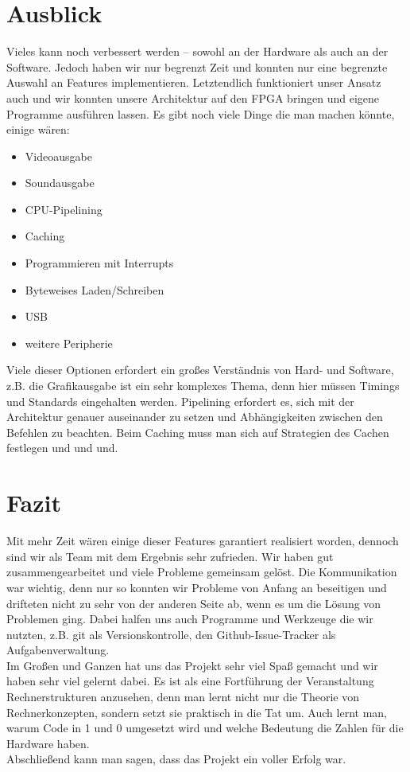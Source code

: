 \section{Ausblick}
Vieles kann noch verbessert werden -- sowohl an der Hardware als auch an der Software. Jedoch haben wir nur begrenzt Zeit und konnten nur eine begrenzte Auswahl an Features implementieren. Letztendlich funktioniert unser Ansatz auch und wir konnten unsere Architektur auf den FPGA bringen und eigene Programme ausführen lassen. Es gibt noch viele Dinge die man machen könnte, einige wären:
\begin{itemize}
  \item Videoausgabe
  \item Soundausgabe
  \item CPU-Pipelining
  \item Caching
  \item Programmieren mit Interrupts
  \item Byteweises Laden/Schreiben
  \item USB
  \item weitere Peripherie
\end{itemize}
Viele dieser Optionen erfordert ein großes Verständnis von Hard- und Software, z.B. die Grafikausgabe ist ein sehr komplexes Thema, denn hier müssen Timings und Standards eingehalten werden. Pipelining erfordert es, sich mit der Architektur genauer auseinander zu setzen und Abhängigkeiten zwischen den Befehlen zu beachten. Beim Caching muss man sich auf Strategien des Cachen festlegen und und und.

\section{Fazit}
Mit mehr Zeit wären einige dieser Features garantiert realisiert worden, dennoch sind wir als Team mit dem Ergebnis sehr zufrieden. Wir haben gut zusammengearbeitet und viele Probleme gemeinsam gelöst. Die Kommunikation war wichtig, denn nur so konnten wir Probleme von Anfang an beseitigen und drifteten nicht zu sehr von der anderen Seite ab, wenn es um die Lösung von Problemen ging. Dabei halfen uns auch Programme und Werkzeuge die wir nutzten, z.B. git als Versionskontrolle, den Github-Issue-Tracker als Aufgabenverwaltung.\\
Im Großen und Ganzen hat uns das Projekt sehr viel Spaß gemacht und wir haben sehr viel gelernt dabei. Es ist als eine Fortführung der Veranstaltung Rechnerstrukturen anzusehen, denn man lernt nicht nur die Theorie von Rechnerkonzepten, sondern setzt sie praktisch in die Tat um. Auch lernt man, warum Code in 1 und 0 umgesetzt wird und welche Bedeutung die Zahlen für die Hardware haben.\\
Abschließend kann man sagen, dass das Projekt ein voller Erfolg war.
